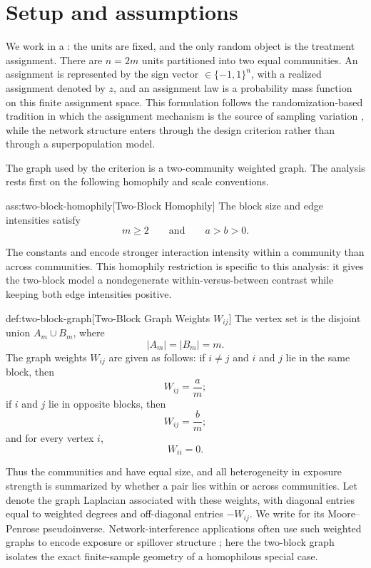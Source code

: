 \documentclass[11pt]{article}
\begin{document}
\section{Setup and assumptions}

We work in a : the units are fixed, and the only random object is the treatment assignment. There are \(n=2m\) units partitioned into two equal communities. An assignment is represented by the sign vector \(\in\{-1,1\}^n\), with a realized assignment denoted by \(z\), and an assignment law  is a probability mass function on this finite assignment space. This formulation follows the randomization-based tradition in which the assignment mechanism is the source of sampling variation \citep{horvitz1952,rubin1974}, while the network structure enters through the design criterion rather than through a superpopulation model.

The graph used by the criterion is a two-community weighted graph. The analysis rests first on the following homophily and scale conventions.

\begin{assumptionv}{ass:two-block-homophily}[Two-Block Homophily]
The block size and edge intensities satisfy
\[
m\ge 2
\qquad\text{and}\qquad
a>b>0.
\]
\end{assumptionv}

The constants  and  encode stronger interaction intensity within a community than across communities. This homophily restriction is specific to this analysis: it gives the two-block model a nondegenerate within-versus-between contrast while keeping both edge intensities positive.

\begin{definitionv}{def:two-block-graph}[Two-Block Graph Weights \(W_{ij}\)]
The vertex set is the disjoint union \(A_m\cup B_m\), where
\[
|A_m|=|B_m|=m.
\]
The graph weights \(W_{ij}\) are given as follows: if \(i\ne j\) and \(i\) and \(j\) lie in the same block, then
\[
W_{ij}=\frac{a}{m};
\]
if \(i\) and \(j\) lie in opposite blocks, then
\[
W_{ij}=\frac{b}{m};
\]
and for every vertex \(i\),
\[
W_{ii}=0.
\]
\end{definitionv}

Thus the communities  and  have equal size, and all heterogeneity in exposure strength is summarized by whether a pair lies within or across communities. Let  denote the graph Laplacian associated with these weights, with diagonal entries equal to weighted degrees and off-diagonal entries \(-W_{ij}\). We write  for its Moore--Penrose pseudoinverse. Network-interference applications often use such weighted graphs to encode exposure or spillover structure \citep{hudgens2008,aronow2013,savje2017,leung2019,li2020}; here the two-block graph isolates the exact finite-sample geometry of a homophilous special case.
\end{document}
